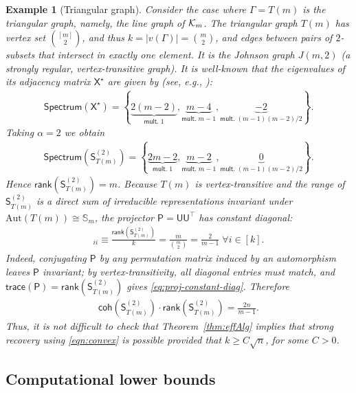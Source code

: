 \documentclass[12pt]{article}
\newtheorem{example}{Example}
\newcommand{\calK}{{\cal K}}
\newcommand{\ppp}[1]{\left\{#1\right\}}
\newcommand{\s}[1]{\mathsf{#1}}
\begin{document}
\begin{example}[Triangular graph]
Consider the case where $\Gamma=T(m)$ is the triangular graph, namely, the line graph of $\calK_m$. The triangular graph $T(m)$ has vertex set $\binom{[m]}{2}$, and thus $k=|v(\Gamma)|=\binom{m}{2}$, and edges between pairs of $2$-subsets that intersect in exactly one element. It is the Johnson graph $J(m,2)$ (a strongly regular, vertex-transitive graph). It is well-known that the eigenvalues of its adjacency matrix $\s{X}^\star$ are given by (see, e.g., \cite{nikiforov2017norms}): 
\begin{align}
\s{Spectrum}(\s{X}^\star)=\ppp{\underbrace{2(m-2)}_{\s{mult.}\; 1},\underbrace{m-4}_{\s{mult.}\; m-1},\underbrace{-2}_{\s{mult.}\;(m-1)(m-2)/2}}.
\end{align}
Taking $\alpha=2$ we obtain
\begin{align}
\s{Spectrum}(\s{S}_{T(m)}^{(2)})=\ppp{\underbrace{2m-2}_{\s{mult.}\; 1},\underbrace{m-2}_{\s{mult.}\; m-1},\underbrace{0}_{\s{mult.}\;(m-1)(m-2)/2}}.
\end{align}
Hence $\s{rank}(\s{S}_{T(m)}^{(2)})=m$. Because $T(m)$ is vertex-transitive and the range of $\s{S}_{T(m)}^{(2)}$ is a direct sum of irreducible representations invariant under $\mathrm{Aut}(T(m))\cong \mathbb{S}_m$, the projector $\s{P} = \s{U}\s{U}^\top$ has constant diagonal:
\begin{align}
[\s{P}]_{ii}\equiv \frac{\s{rank}(\s{S}_{T(m)}^{(2)})}{k}=\frac{m}{\binom{m}{2}}=\frac{2}{m-1}\;\forall i\in [k].\label{eq:proj-constant-diag}
\end{align}
Indeed, conjugating $\s{P}$ by any permutation matrix induced by an automorphism leaves $\s{P}$ invariant; by vertex-transitivity, all diagonal entries must match, and $\s{trace}(\s{P})=\s{rank}(\s{S}_{T(m)}^{(2)})$ gives \eqref{eq:proj-constant-diag}. Therefore
\begin{align}
\s{coh}(\s{S}_{T(m)}^{(2)})\cdot\s{rank}(\s{S}_{T(m)}^{(2)})=\frac{2n}{m-1}.
\end{align}
Thus, it is not difficult to check that Theorem~\ref{thm:effAlg} implies that strong recovery using \eqref{eqn:convex} is possible provided that $k\geq C\sqrt{n}$, for some $C>0$.
\end{example}

\subsection{Computational lower bounds}\label{subsec:ldp-intro}
\end{document}
